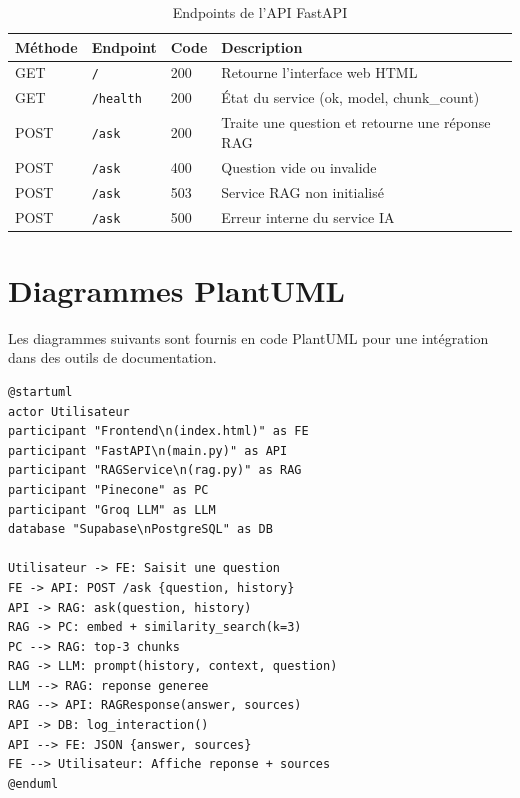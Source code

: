 \documentclass[12pt, a4paper, twoside]{report}
\begin{document}
\begin{table}[H]
\centering
\caption{Endpoints de l'API FastAPI}
\label{tab:endpoints}
\begin{tabularx}{\textwidth}{l l l X}
\toprule
\rowcolor{primary!10}
\textbf{Méthode} & \textbf{Endpoint} & \textbf{Code} & \textbf{Description} \\
\midrule
GET  & \texttt{/}       & 200 & Retourne l'interface web HTML \\
GET  & \texttt{/health} & 200 & État du service (ok, model, chunk\_count) \\
POST & \texttt{/ask}    & 200 & Traite une question et retourne une réponse RAG \\
POST & \texttt{/ask}    & 400 & Question vide ou invalide \\
POST & \texttt{/ask}    & 503 & Service RAG non initialisé \\
POST & \texttt{/ask}    & 500 & Erreur interne du service IA \\
\bottomrule
\end{tabularx}
\end{table}

\chapter{Diagrammes PlantUML}

Les diagrammes suivants sont fournis en code PlantUML pour une intégration dans des outils de documentation.

\begin{lstlisting}[language={}, caption={Diagramme de séquence PlantUML}, label={lst:plantuml}]
@startuml
actor Utilisateur
participant "Frontend\n(index.html)" as FE
participant "FastAPI\n(main.py)" as API
participant "RAGService\n(rag.py)" as RAG
participant "Pinecone" as PC
participant "Groq LLM" as LLM
database "Supabase\nPostgreSQL" as DB

Utilisateur -> FE: Saisit une question
FE -> API: POST /ask {question, history}
API -> RAG: ask(question, history)
RAG -> PC: embed + similarity_search(k=3)
PC --> RAG: top-3 chunks
RAG -> LLM: prompt(history, context, question)
LLM --> RAG: reponse generee
RAG --> API: RAGResponse(answer, sources)
API -> DB: log_interaction()
API --> FE: JSON {answer, sources}
FE --> Utilisateur: Affiche reponse + sources
@enduml
\end{lstlisting}
\end{document}
